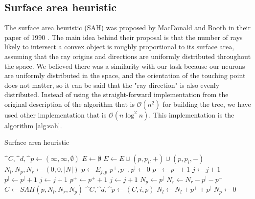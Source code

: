 \subsection{Surface area heuristic}
The surface area heuristic (SAH) was proposed by MacDonald and Booth in their paper of 1990 \cite{MacDonald1990-jo}. The main idea behind their proposal is that the number of rays likely to intersect a convex object is roughly proportional to its surface area, assuming that the ray origins and directions are uniformly distributed throughout the space. We believed there was a similarity with our task because our neurons are uniformly distributed in the space, and the orientation of the touching point does not matter, so it can be said that the "ray direction" is also evenly distributed. Instead of using the straight-forward implementation from the original description of the algorithm that is $\mathcal{O}(n^2)$ for building the tree, we have used other implementation \cite{WaldHavran06} that is $\mathcal{O}(n \log^2{}n)$. This implementation is the algorithm \ref{alg:sah}.
\begin{algorithm}[h!]
    \caption{Surface area heuristic
        \label{alg:sah}}
    \begin{algorithmic}[1]
    \Statex
        \State $\^{C}, \^{d}, \^{p} \gets (\infty, \infty, \emptyset)$
            \State $E \gets \emptyset$
                \State $E \gets E \cup (p,p_i,+) \cup (p,p_i,-)$ \label{alg:sah:change}
            \EndFor
            \State {} 
            \State $N_l, N_p, N_r \gets (0,0,|N|)$
                \State $p \gets E_{j,p}$
                \State $p^{+},p^{-},p^{|} \gets 0$
                    \State $p^{-} \gets p^{-} + 1$
                    \State $j \gets j + 1$
                \EndWhile
                    \State $p^{|} \gets p^{|} + 1$
                    \State $j \gets j + 1$
                \EndWhile
                    \State $p^{+} \gets p^{+} + 1$
                    \State $j \gets j + 1$
                \EndWhile
                \State $N_p \gets p^{|}$
                \State $N_r \gets N_r - p^{|} - p^{-}$
                \State $C \gets SAH(p,N_l,N_r,N_p)$ \label{alg:sah:sah}
                    \State $\^{C}, \^{d}, \^{p} \gets (C, i, p)$
                \EndIf
                \State $N_l \gets N_l + p^{+} + p^{|}$
                \State $N_p \gets 0$
            \EndFor
        \EndFor
        \State {}
    \EndFunction
    \end{algorithmic}
\end{algorithm}

